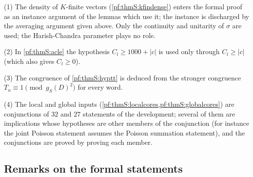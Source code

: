 \begin{remark}\label{pf:thmS:rem2}
(1) The density of $K$-finite vectors (\cref{pf:thmS:kfindense}) enters the formal proof as an instance argument of the lemmas
which use it; the instance is discharged by the averaging argument given above. Only the continuity and unitarity of $\sigma$
are used; the Harish-Chandra parameter plays no role.

(2) In \cref{pf:thmS:acle} the hypothesis $C_l\ge1000+|c|$ is used only through $C_l\ge|c|$ (which also gives $C_l\ge0$).

(3) The congruence of \cref{pf:thmS:hyptt} is deduced from the stronger congruence $T_u\equiv1\pmod{g_S(D)^2}$ for every word.

(4) The local and global inputs (\cref{pf:thmS:localcores,pf:thmS:globalcores}) are conjunctions of $32$ and $27$ statements of the
development; several of them are implications whose hypotheses are other members of the conjunction (for instance the joint
Poisson statement assumes the Poisson summation statement), and the conjunctions are proved by proving each member.
\end{remark}

\subsection{Remarks on the formal statements}\label{sec:pf:thmS:remarks}


